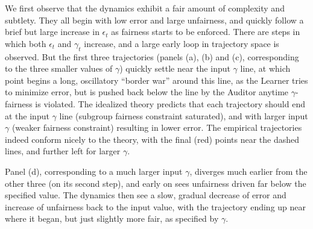 We first observe that the dynamics exhibit a fair amount of complexity and subtlety. They all begin with low error and
large unfairness, and quickly follow a brief but large increase in $\epsilon_t$ as fairness starts to be enforced. There
are steps in which both $\epsilon_t$ and $\gamma_t$ increase, and a large early loop in trajectory space is observed.
But the first three trajectories (panels (a), (b) and (c), corresponding to the three smaller values of $\gamma$) quickly settle near the
input $\gamma$ line, at which point begins a long, oscillatory ``border war'' around this line, as the Learner tries to minimize
error, but is pushed back below the line by the Auditor anytime $\gamma$-fairness is violated. The idealized theory predicts
that each trajectory should end at the input $\gamma$ line (subgroup fairness constraint saturated), and with larger
input $\gamma$ (weaker fairness constraint) resulting in lower error. The empirical trajectories indeed conform nicely
to the theory, with the final (red) points near the dashed lines, and further left for larger $\gamma$.

Panel (d), corresponding to a much larger input $\gamma$, diverges much earlier from the other three (on its second step),
and early on sees unfairness driven far below the specified value. The dynamics then see a slow, gradual decrease of
error and increase of unfairness back to the input value, with the trajectory ending up near where it began, but just
slightly more fair, as specified by $\gamma$.


